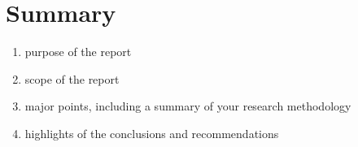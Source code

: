 \section{Summary}

\begin{enumerate}
    \item purpose of the report
    \item scope of the report
    \item major points, including a summary of your research methodology
    \item highlights of the conclusions and recommendations
\end{enumerate}
